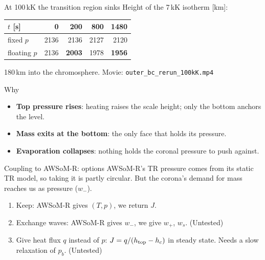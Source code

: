 \documentclass[aspectratio=169,11pt]{beamer}
\begin{document}
\begin{frame}{At 100\,kK the transition region sinks}
  \centering
  Height of the 7\,kK isotherm [km]:
  \vspace{0.6em}

  \begin{tabular}{@{}l r r r r@{}}
    \toprule
    $t$ [s] & 0 & 200 & 800 & 1480 \\
    \midrule
    fixed $p$    & 2136 & 2136 & 2127 & 2120 \\
    floating $p$ & 2136 & \textbf{2003} & 1978 & \textbf{1956} \\
    \bottomrule
  \end{tabular}
  \vspace{0.8em}

  180\,km into the chromosphere. Movie: \texttt{outer\_bc\_rerun\_100kK.mp4}
\end{frame}

\begin{frame}{Why}
  \begin{itemize}
    \item \textbf{Top pressure rises}: heating raises the scale height; only the bottom
          anchors the level.
    \item \textbf{Mass exits at the bottom}: the only face that holds its pressure.
    \item \textbf{Evaporation collapses}: nothing holds the coronal pressure to push against.
  \end{itemize}
\end{frame}

\begin{frame}{Coupling to AWSoM-R: options}
  AWSoM-R's TR pressure comes from its static TR model, so taking it is partly circular.
  But the corona's demand for mass reaches us as pressure ($w_-$).
  \vspace{0.5em}
  \begin{enumerate}
    \item Keep: AWSoM-R gives $(T,p)$, we return $J$.
    \item Exchange waves: AWSoM-R gives $w_-$, we give $w_+$, $w_s$. (Untested)
    \item Give heat flux $q$ instead of $p$: $J = q/(h_{\rm top}-h_c)$ in steady state.
          Needs a slow relaxation of $p_b$. (Untested)
  \end{enumerate}
\end{frame}
\end{document}

